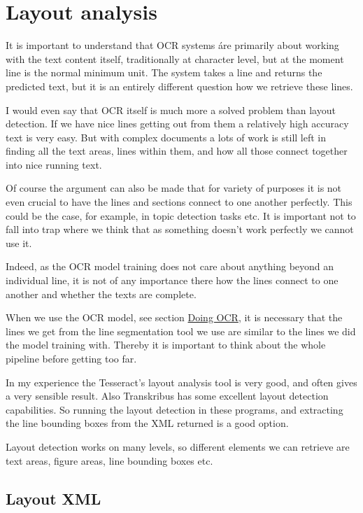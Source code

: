 \documentclass[]{book}
\begin{document}
\hypertarget{layout}{%
\chapter{Layout analysis}\label{layout}}

It is important to understand that OCR systems áre primarily about working with the text content itself, traditionally at character level, but at the moment line is the normal minimum unit. The system takes a line and returns the predicted text, but it is an entirely different question how we retrieve these lines.

I would even say that OCR itself is much more a solved problem than layout detection. If we have nice lines getting out from them a relatively high accuracy text is very easy. But with complex documents a lots of work is still left in finding all the text areas, lines within them, and how all those connect together into nice running text.

Of course the argument can also be made that for variety of purposes it is not even crucial to have the lines and sections connect to one another perfectly. This could be the case, for example, in topic detection tasks etc. It is important not to fall into trap where we think that as something doesn't work perfectly we cannot use it.

Indeed, as the OCR model training does not care about anything beyond an individual line, it is not of any importance there how the lines connect to one another and whether the texts are complete.

When we use the OCR model, see section \href{./doing-ocr}{Doing OCR}, it is necessary that the lines we get from the line segmentation tool we use are similar to the lines we did the model training with. Thereby it is important to think about the whole pipeline before getting too far.

In my experience the Tesseract's layout analysis tool is very good, and often gives a very sensible result. Also Transkribus has some excellent layout detection capabilities. So running the layout detection in these programs, and extracting the line bounding boxes from the XML returned is a good option.

Layout detection works on many levels, so different elements we can retrieve are text areas, figure areas, line bounding boxes etc.

\hypertarget{layout-xml}{%
\section{Layout XML}\label{layout-xml}}
\end{document}
